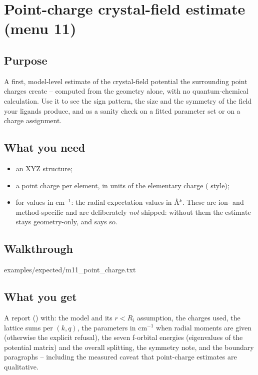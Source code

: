 \chapter{Point-charge crystal-field estimate (menu 11)}
\label{ch:menu11}

\section{Purpose}

A first, model-level estimate of the crystal-field potential the surrounding
point charges create -- computed from the geometry alone, with no
quantum-chemical calculation. Use it to see the sign pattern, the size and the
symmetry of the field your ligands produce, and as a sanity check on a fitted
parameter set or on a charge assignment.

\section{What you need}

\begin{itemize}
  \item an XYZ structure;
  \item a point charge per element, in units of the elementary charge
    ( style);
  \item for values in cm$^{-1}$: the radial expectation values
     in \AA$^k$. These are ion- and method-specific and are
    deliberately \emph{not} shipped: without them the estimate stays
    geometry-only, and says so.
\end{itemize}

\section{Walkthrough}


  {examples/expected/m11_point_charge.txt}

\section{What you get}

A report () with: the model and its $r < R_i$
assumption, the charges used, the lattice sums per $(k,q)$, the parameters in
cm$^{-1}$ when radial moments are given (otherwise the explicit refusal), the
seven f-orbital energies (eigenvalues of the potential matrix) and the overall
splitting, the symmetry note, and the boundary paragraphs -- including the
measured caveat that point-charge estimates are qualitative.

